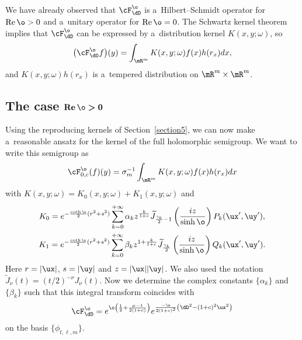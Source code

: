 We have already observed that $\cF_{\dD}^{\o}$ is a~Hilbert--Schmidt operator
for $\operatorname{Re}\o>0$ and a~unitary operator for $\operatorname{Re}\o=0$.
The Schwartz kernel theorem implies
that $\cF_{\dD}^{\o}$ can be expressed by a~distribution kernel
$K(x,y;\omega)$, so
\begin{gather*}
\big(\cF_{\dD}^{\o}f\big)(y)=\int_{\mR^m}K(x,y;\omega)f(x)h(r_{x})dx,
\end{gather*}
and $K(x,y;\omega)h(r_{x})$ is a~tempered distribution
on $\mR^m\times\mR^m$.

\subsection[The case $\operatorname{Re}\o>0$]{The case $\boldsymbol{\operatorname{Re}\o>0}$}

Using the reproducing kernels of Section~\ref{section5}, we can now make a~reasonable ansatz for
the kernel of the full holomorphic semigroup.
We want to write this semigroup as
\begin{gather*}
\cF_{0,c}^{\o}(f)(y)=\sigma_{m}^{-1}\int_{\mR^{m}}K(x,y;\omega)f(x)h(r_{x})dx
\end{gather*}
with $K(x,y;\omega)=K_{0}(x,y;\omega)+K_{1}(x,y;\omega)$ and
\begin{gather}
K_{0} = e^{-\frac{\coth{\o}}{2} (r^{2}+ s^{2})}\sum_{k=0}^{+\infty} \alpha_{k} z^{\frac{k}{1+c}}
\widetilde{J}_{\frac{\gamma_{k}}{2} -1}\left(\frac{iz}{\sinh{\o}}\right) P_{k}(\ux', \uy'),\nonumber\\
K_{1} = e^{-\frac{\coth{\o}}{2} (r^{2}+ s^{2})} \sum_{k=0}^{+\infty} \beta_{k} z^{1+\frac{k}{1+c}}
\widetilde{J}_{\frac{\gamma_{k}}{2}}\left(\frac{iz}{\sinh{\o}}\right) Q_{k}(\ux', \uy').\label{seriessemigroup}
\end{gather}
Here $r=|\ux|$, $s=|\uy|$ and $z=|\ux||\uy|$.
We also used the notation $\widetilde{J}_{\nu}(t)=(t/2)^{-\nu}J_{\nu}(t)$.
Now we determine the complex constants $\{\alpha_{k}\}$ and $\{\beta_{k}\}$ such that this
integral transform coincides with
\begin{gather*}
\cF_{\dD}^{\o}=e^{\o\left(\frac{1}{2}+\frac{\mu-1}{2(1+c)}\right)}e^{\frac{-\o}{
2(1+c)^{2}}\left(\dD^{2}-(1+c)^{2}\ux^{2}\right)}
\end{gather*}
on the basis $\{\phi_{t,\ell,m}\}$.

